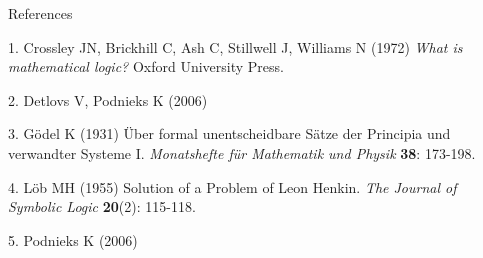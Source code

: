 \documentclass[12pt]{article}
\begin{document}
References

1. Crossley JN, Brickhill C, Ash C, Stillwell J, Williams
N (1972) \emph{What is mathematical logic?} Oxford University Press.

2. Detlovs V, Podnieks K (2006)  

3. G\"odel K (1931) \"Uber formal unentscheidbare S\"atze der
Principia  und verwandter Systeme I. \emph{Monatshefte
f\"ur Mathematik und Physik} \textbf{38}: 173-198.

4. L\"ob MH (1955) Solution of a Problem of Leon Henkin.
\emph{The Journal of Symbolic Logic} \textbf{20}(2): 115-118.

5. Podnieks K (2006)  
\end{document}
